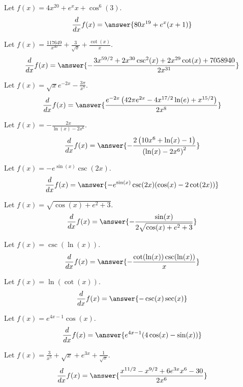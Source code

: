 \documentclass{ximera}
\begin{document}
\begin{shuffle}
\begin{exercise}
Let $f(x)=4 x^{20}+e^x x+\cos ^6(3)$.
\[
\ddx f(x) = \answer{80 x^{19}+e^x (x+1)}
\]
\end{exercise}

\begin{exercise}
Let $f(x)=\frac{117649}{x^{30}}+\frac{3}{\sqrt{x}}+\frac{\cot (x)}{x}$.
\[
\ddx f(x) = \answer{-\frac{3 x^{59/2}+2 x^{30} \csc ^2(x)+2 x^{29} \cot (x)+7058940}{2 x^{31}}}
\]
\end{exercise}

\begin{exercise}
Let $f(x)=\sqrt{x} e^{-2 x}-\frac{3 \pi }{x^7}$.
\[
\ddx f(x) = \answer{\frac{e^{-2 x} \left(42 \pi  e^{2 x}-4 x^{17/2} \ln (e)+x^{15/2}\right)}{2 x^8}}
\]
\end{exercise}

\begin{exercise}
Let $f(x)=-\frac{2 x}{\ln (x)-2 x^6}$.
\[
\ddx f(x) = \answer{-\frac{2 \left(10 x^6+\ln (x)-1\right)}{\left(\ln (x)-2 x^6\right)^2}}
\]
\end{exercise}

\begin{exercise}
Let $f(x)=-e^{\sin (x)} \csc (2 x)$.
\[
\ddx f(x) = \answer{-e^{\sin (x)} \csc (2 x) (\cos (x)-2 \cot (2 x))}
\]
\end{exercise}

\begin{exercise}
Let $f(x)=\sqrt{\cos (x)+e^2+3}$.
\[
\ddx f(x) = \answer{-\frac{\sin (x)}{2 \sqrt{\cos (x)+e^2+3}}}
\]
\end{exercise}

\begin{exercise}
Let $f(x)=\csc (\ln (x))$.
\[
\ddx f(x) = \answer{-\frac{\cot (\ln (x)) \csc (\ln (x))}{x}}
\]
\end{exercise}

\begin{exercise}
Let $f(x)=\ln (\cot (x))$.
\[
\ddx f(x) = \answer{-\csc (x) \sec (x)}
\]
\end{exercise}

\begin{exercise}
Let $f(x)=e^{4 x-1} \cos (x)$.
\[
\ddx f(x) = \answer{e^{4 x-1} (4 \cos (x)-\sin (x))}
\]
\end{exercise}

\begin{exercise}
Let $f(x)=\frac{3}{x^5}+\sqrt{x}+e^{3 x}+\frac{1}{\sqrt{x}}$.
\[
\ddx f(x) = \answer{\frac{x^{11/2}-x^{9/2}+6 e^{3 x} x^6-30}{2 x^6}}
\]
\end{exercise}


\end{shuffle}
\end{document}
